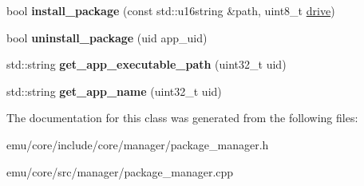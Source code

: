 \begin{DoxyCompactItemize}
\mbox{\label{classeka2l1_1_1manager_1_1package__manager_a7d462d5cb14aeabc0c9ffb48c5a26110}} 
bool {\bfseries install\+\_\+package} (const std\+::u16string \&path, uint8\+\_\+t \mbox{\hyperlink{structeka2l1_1_1drive}{drive}})
\item 
\mbox{\label{classeka2l1_1_1manager_1_1package__manager_aeb807ef833cb8ed723406eab7e2e5935}} 
bool {\bfseries uninstall\+\_\+package} (uid app\+\_\+uid)
\item 
\mbox{\label{classeka2l1_1_1manager_1_1package__manager_a9d8d0e9440143848a2bae1558d78147c}} 
std\+::string {\bfseries get\+\_\+app\+\_\+executable\+\_\+path} (uint32\+\_\+t uid)
\item 
\mbox{\label{classeka2l1_1_1manager_1_1package__manager_a86eed003ec73f58f188627b6d18c5bc1}} 
std\+::string {\bfseries get\+\_\+app\+\_\+name} (uint32\+\_\+t uid)
\end{DoxyCompactItemize}


The documentation for this class was generated from the following files\+:\begin{DoxyCompactItemize}
\item 
emu/core/include/core/manager/package\+\_\+manager.\+h\item 
emu/core/src/manager/package\+\_\+manager.\+cpp\end{DoxyCompactItemize}
